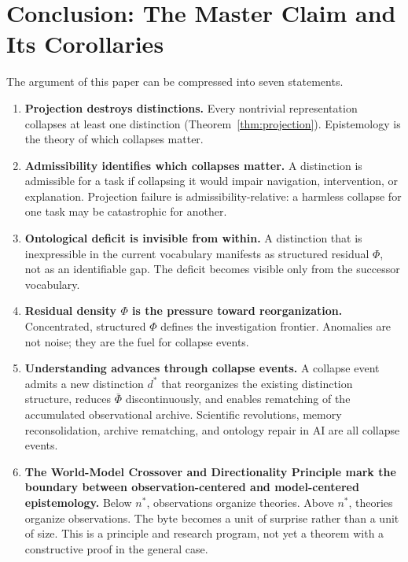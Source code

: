 \documentclass[11pt, a4paper]{article}
\theoremstyle{plain}
\theoremstyle{definition}
\theoremstyle{remark}
\newcommand{\PhiF}{\varPhi}
\newcommand{\nstar}{n^{*}}
\begin{document}
\section{Conclusion: The Master Claim and Its Corollaries}
\label{sec:conclusion}

The argument of this paper can be compressed into seven statements.

\begin{enumerate}
  \item \textbf{Projection destroys distinctions.}
        Every nontrivial representation collapses at least one
        distinction (Theorem~\ref{thm:projection}).
        Epistemology is the theory of which collapses matter.

  \item \textbf{Admissibility identifies which collapses matter.}
        A distinction is admissible for a task if collapsing it
        would impair navigation, intervention, or explanation.
        Projection failure is admissibility-relative:
        a harmless collapse for one task may be catastrophic for another.

  \item \textbf{Ontological deficit is invisible from within.}
        A distinction that is inexpressible in the current vocabulary
        manifests as structured residual $\PhiF$, not as an identifiable gap.
        The deficit becomes visible only from the successor vocabulary.

  \item \textbf{Residual density $\PhiF$ is the pressure toward reorganization.}
        Concentrated, structured $\PhiF$ defines the investigation frontier.
        Anomalies are not noise; they are the fuel for collapse events.

  \item \textbf{Understanding advances through collapse events.}
        A collapse event admits a new distinction $d^*$ that
        reorganizes the existing distinction structure, reduces
        $\bar\PhiF$ discontinuously, and enables rematching of the
        accumulated observational archive.
        Scientific revolutions, memory reconsolidation, archive
        rematching, and ontology repair in AI are all collapse events.

  \item \textbf{The World-Model Crossover and Directionality Principle
        mark the boundary between observation-centered and model-centered
        epistemology.}
        Below $\nstar$, observations organize theories.
        Above $\nstar$, theories organize observations.
        The byte becomes a unit of surprise rather than a unit of size.
        This is a principle and research program, not yet a theorem
        with a constructive proof in the general case.


\end{enumerate}
\end{document}
